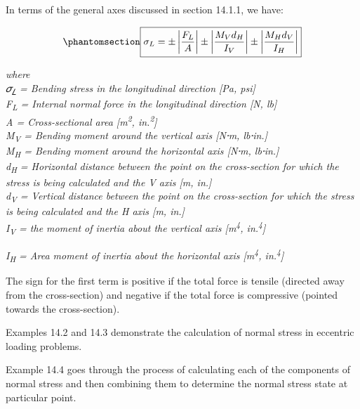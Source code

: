 \documentclass[
  letterpaper,
  DIV=11,
  numbers=noendperiod]{scrreprt}
\theoremstyle{definition}
\theoremstyle{remark}
\begin{document}
In terms of the general axes discussed in section 14.1.1, we have:

\begin{equation}\phantomsection\label{eq-14.2}{
\boxed{\sigma_L= \pm\left|\frac{F_L}{A}\right| \pm\left|\frac{M_V d_H}{I_V}\right| \pm\left|\frac{M_H d_V}{I_H}\right|}
}\end{equation}

\emph{where}\\
\emph{𝜎\textsubscript{𝐿} = Bending stress in the longitudinal direction
{[}Pa, psi{]}}\\
\emph{F\textsubscript{L} = Internal normal force in the longitudinal
direction {[}N, lb{]}}\\
\emph{A = Cross-sectional area {[}m\textsuperscript{2},
in.\textsuperscript{2}{]}}\\
\emph{M\textsubscript{V} = Bending moment around the vertical axis
{[}N⸱m, lb⸱in.{]}}\\
\emph{M\textsubscript{H} = Bending moment around the horizontal axis
{[}N⸱m, lb⸱in.{]}}\\
\emph{d\textsubscript{H} = Horizontal distance between the point on the
cross-section for which the stress is being calculated and the V axis
{[}m, in.{]}}\\
\emph{d\textsubscript{V} = Vertical distance between the point on the
cross-section for which the stress is being calculated and the H axis
{[}m, in.{]}}\\
\emph{I\textsubscript{V} = the moment of inertia about the vertical axis
{[}m\textsuperscript{4}, in.\textsuperscript{4}{]}}

\emph{I\textsubscript{H} = Area moment of inertia about the horizontal
axis {[}m\textsuperscript{4}, in.\textsuperscript{4}{]}}

The sign for the first term is positive if the total force is tensile
(directed away from the cross-section) and negative if the total force
is compressive (pointed towards the cross-section).

Examples 14.2 and 14.3 demonstrate the calculation of normal stress in
eccentric loading problems.

Example 14.4 goes through the process of calculating each of the
components of normal stress and then combining them to determine the
normal stress state at particular point.
\end{document}
